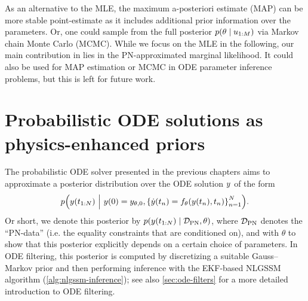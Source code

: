 \documentclass{mimosis}
\begin{document}
\begin{remark}
As an alternative to the MLE, the maximum a-posteriori estimate (MAP) can be more stable point-estimate as it includes additional prior information over the parameters.
Or, one could sample from the full posterior \(\p(\theta \mid \oobs_{1:M})\) via Markov chain Monte Carlo (MCMC).
While we focus on the MLE in the following, our main contribution in \fenrir{} lies in the PN-approximated marginal likelihood.
It could also be used for MAP estimation or MCMC in ODE parameter inference problems, but this is left for future work.
\end{remark}
\section{Probabilistic ODE solutions as physics-enhanced priors}
\label{sec:org9179f01}
The probabilistic ODE solver presented in the previous chapters aims to approximate a posterior distribution over the ODE solution \(y\) of the form
\begin{equation}
  \label{eq:fenrir:pnposterior}
  \p( \val(t_{1:N}) ~\Big|~ \val(0) = \val_{\theta,0}, \left\{ \dot{\val}(t_n) = \vf_\theta(\val(t_n), t_n) \right\}_{n=1}^N ).
\end{equation}
Or short, we denote this posterior by \(\p( \val(t_{1:N}) \mid \data_\text{PN}, \theta )\), where
\(\mathcal{D}_\text{PN}\) denotes the ``PN-data'' (i.e. the equality constraints that are conditioned on),
and with \(\theta\) to show that this posterior explicitly depends on a certain choice of parameters.
In ODE filtering, this posterior is computed by discretizing a suitable Gauss--Markov prior and then performing inference with the EKF-based NLGSSM algorithm (\ref{alg:nlgssm-inference});
see also \cref{sec:ode-filters} for a more detailed introduction to ODE filtering.
\end{document}
